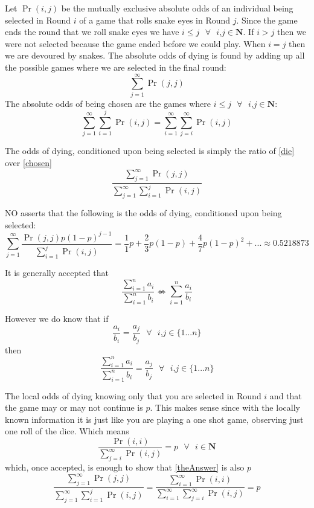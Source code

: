 \documentclass[12pt, letterpaper]{article}
\begin{document}
Let $\Pr(i,j)$ be the mutually exclusive absolute odds of an individual being selected in Round $i$ of a game that rolls snake eyes in Round $j$. Since the game ends the round that we roll snake eyes we have $i\leq j \text{ }\forall \text{ } i\text{,}j \in \mathbf{N}$. If $i > j$ then we were not selected because the game ended before we could play. When $i=j$ then we are devoured by snakes.
The absolute odds of dying is found by adding up all the possible games where we are selected in the final round:
\begin{equation}
    \sum_{j=1}^{\infty} \Pr(j,j) \label{die}
\end{equation} 
The absolute odds of being chosen are the games where  $i\leq j \text{ }\forall \text{ } i\text{,}j \in \mathbf{N}$:
\begin{equation}
   \sum_{j=1}^{\infty} \sum_{i=1}^{j} \Pr(i,j) = \sum_{i=1}^{\infty} \sum_{j=i}^{\infty} \Pr(i,j) \label{chosen} 
\end{equation}

The odds of dying, conditioned upon being selected is simply the ratio of \ref{die} over \ref{chosen}
\begin{equation}
    \frac{\sum_{j=1}^{\infty} \Pr(j,j)}{\sum_{j=1}^{\infty} \sum_{i=1}^{j} \Pr(i,j)}\label{theAnswer}
\end{equation}

NO asserts that the following is the odds of dying, conditioned upon being selected:
$$\sum_{j=1}^{\infty} \frac{\Pr(j,j)p(1-p)^{j-1}}{\sum_{i=1}^{j} \Pr(i,j)} = \frac{1}{1}p + \frac{2}{3}p(1-p) + \frac{4}{7}p(1-p)^2 + ... \approx 0.5218873$$

It is generally accepted that 
$$\frac{\sum_{i=1}^{n} a_i}{\sum_{i=1}^{n} b_i}\nLeftrightarrow \sum_{i=1}^{n} \frac{a_i}{b_i}$$

However we do know that if 
$$\frac{a_i}{b_i}=\frac{a_j}{b_j} \text{   } \forall \text{ } i\text{,}j \in \{1...n\}$$
then
$$\frac{\sum_{i=1}^{n} a_i}{\sum_{i=1}^{n} b_i} = \frac{a_j}{b_j}\text{   } \forall \text{ } i\text{,}j \in \{1...n\}$$

The local odds of dying knowing only that you are selected in Round $i$ and that the game may or may not continue is $p$.  This makes sense since with the locally known information it is just like you are playing a one shot game, observing just one roll of the dice.  Which means
$$\frac{\Pr(i,i)}{\sum_{j=i}^{\infty}\Pr(i,j)} = p \text{  }\forall \text{  } i \in \mathbf{N}$$
which, once accepted, is enough to show that \ref{theAnswer} is also $p$
$$ \frac{\sum_{j=1}^{\infty} \Pr(j,j)}{\sum_{j=1}^{\infty} \sum_{i=1}^{j} \Pr(i,j)} = \frac{\sum_{i=1}^{\infty}\Pr(i,i)}{\sum_{i=1}^{\infty}\sum_{j=i}^{\infty}\Pr(i,j)} = p $$
\end{document}
